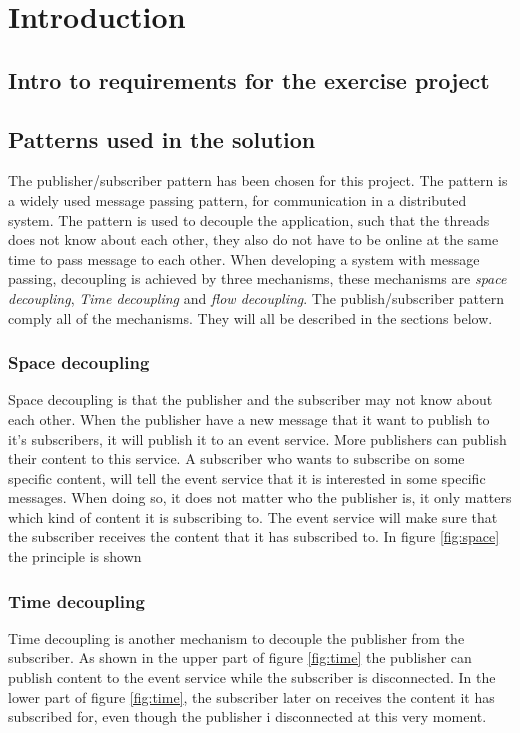 \chapter{Introduction}
\label{chp:intro}

\section{Intro to requirements for the exercise project}

\section{Patterns used in the solution}
The publisher/subscriber pattern has been chosen for this project. The pattern is a widely used message passing pattern, for communication in a distributed system. The pattern is used to decouple the application, such that the threads does not know about each other, they also do not have to be online at the same time to pass message to each other. When developing a system with message passing, decoupling is achieved by three mechanisms, these mechanisms are \emph{space decoupling}, \emph{Time decoupling} and \emph{flow decoupling}. The publish/subscriber pattern comply all of the mechanisms. They will all be described in the sections below.

\subsection{Space decoupling}
Space decoupling is that the publisher and the subscriber may not know about each other. When the publisher have a new message that it want to publish to it's subscribers, it will publish it to an event service. More publishers can publish their content to this service. A subscriber who wants to subscribe on some specific content, will tell the event service that it is interested in some specific messages. When doing so, it does not matter who the publisher is, it only matters which kind of content it is subscribing to. The event service will make sure that the subscriber receives the content that it has subscribed to. In figure \ref{fig:space} the principle is shown


\subsection{Time decoupling}
Time decoupling is another mechanism to decouple the publisher from the subscriber. As shown in the upper part of figure \ref{fig:time} the publisher can publish content to the event service while the subscriber is disconnected. In the lower part of figure \ref{fig:time}, the subscriber later on receives the content it has subscribed for, even though the publisher i disconnected at this very moment.

